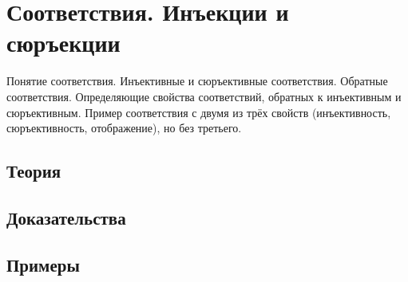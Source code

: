 
\section{Соответствия. Инъекции и сюръекции}
\label{sec:2.2.02-correspondences}

\begin{ticket}
Понятие соответствия. Инъективные и сюръективные соответствия. Обратные соответствия. Определяющие свойства соответствий, обратных к инъективным и сюръективным. Пример соответствия с двумя из трёх свойств (инъективность, сюръективность, отображение), но без третьего.
\end{ticket}

\subsection*{Теория}

\subsection*{Доказательства}

\subsection*{Примеры}
